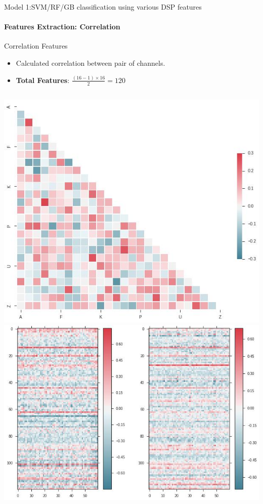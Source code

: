 \documentclass{beamer}
\begin{document}
\begin{frame}{Model 1:SVM/RF/GB classification using various DSP features}
  \framesubtitle{Features Extraction: Correlation}
 
  \begin{block}{Correlation Features}
    \begin{itemize}

    \item Calculated correlation between pair of channels.
    \item \textbf{Total Features}: $\frac{(16 - 1) \times 16}{2} = 120$
 
    \end{itemize}

  \end{block}

  \begin{columns}
    \includegraphics[scale=0.22]{img/corr1.png}
    \includegraphics[scale=0.22]{img/corr2.png}
  \end{columns}
\end{frame}
\end{document}
